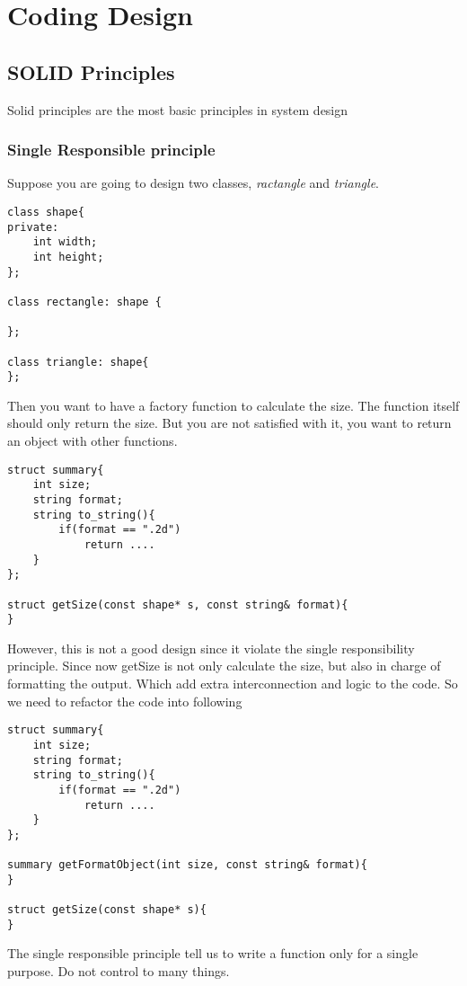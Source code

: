 \newpage
\section{Coding Design}
\subsection{SOLID Principles}
Solid principles are the most basic principles in system design

\subsubsection{Single Responsible principle}
Suppose you are going to design two classes, \textit{ractangle} and \textit{triangle}.

\begin{lstlisting}
class shape{
private:
	int width;
	int height;
};

class rectangle: shape {

};

class triangle: shape{
};
\end{lstlisting}

Then you want to have a factory function to calculate the size. The function itself should only return the size. But you are not satisfied with it, you want to return an object with other functions.
\begin{lstlisting}
struct summary{
	int size;
	string format;
	string to_string(){
		if(format == ".2d")
			return ....
	}
};

struct getSize(const shape* s, const string& format){
}
\end{lstlisting}

However, this is not a good design since it violate the single responsibility principle. Since now getSize is not only calculate the size, but also in charge of formatting the output.
Which add extra interconnection and logic to the code. So we need to refactor the code into following
\begin{lstlisting}
struct summary{
	int size;
	string format;
	string to_string(){
		if(format == ".2d")
			return ....
	}
};

summary getFormatObject(int size, const string& format){
}

struct getSize(const shape* s){
}
\end{lstlisting}
The single responsible principle tell us to write a function only for a single purpose. Do not control to many things.

